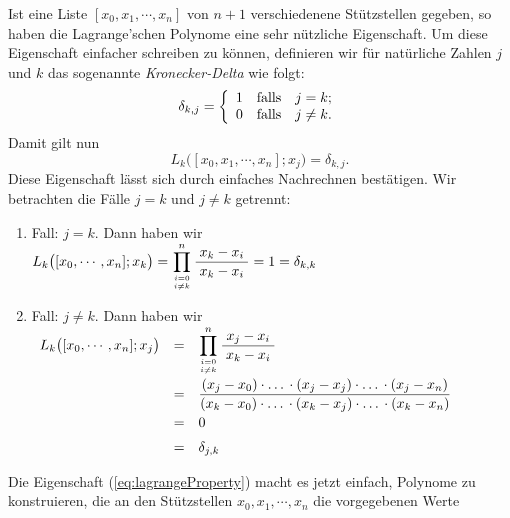 Ist eine Liste $[x_0,x_1,\cdots,x_n]$ von $n+1$ verschiedenene St\"utzstellen gegeben, so
haben die Lagrange'schen Polynome eine sehr n\"utzliche Eigenschaft.  Um diese
Eigenschaft einfacher schreiben zu k\"onnen, definieren wir f\"ur nat\"urliche Zahlen $j$ und
$k$ das sogenannte \emph{Kronecker-Delta} wie folgt:
\begin{equation}
  \label{eq:kroneckerDelta}
  \delta_{k,j} = \left\{ \begin{array}[c]{ll}
                          1 & \mbox{falls} \quad j = k;      \\
                          0 & \mbox{falls} \quad j \not= k.
                         \end{array}
                 \right.  
\end{equation}
Damit gilt nun
\begin{equation}
  \label{eq:lagrangeProperty}
L_k\bigl([x_0,x_1,\cdots,x_n];x_j\bigr) = \delta_{k,j}. 
\end{equation}
Diese Eigenschaft l\"asst sich durch einfaches Nachrechnen best\"atigen.  Wir betrachten die F\"alle
$j=k$ und $j\not=k$ getrennt:
\begin{enumerate}
\item Fall: $j=k$.  Dann haben wir 
      \\[0.2cm]
      \hspace*{0.0cm}
      $\displaystyle L_k\bigl([x_0,\cdots,x_n];x_k\bigr) = \prod\limits_{i=0 \atop i\not=k}^n
      \displaystyle\frac{\;\displaystyle x_k-x_i\;}{\;\displaystyle x_k-x_i\;} = 1 = \delta_{k,k}$
\item Fall: $j\not=k$.  Dann haben wir 
      \\[0.2cm]
      \hspace*{-0.0cm}
      $
      \begin{array}[c]{lcl}
      L_k\bigl([x_0,\cdots,x_n];x_j\bigr) 
      & = & \displaystyle\prod\limits_{i=0 \atop i\not=k}^n \displaystyle\frac{\;\displaystyle x_j-x_i\;}{\;\displaystyle x_k-x_i\;} \\[0.6cm]
      & = & \displaystyle\frac{(x_j - x_0) \cdot \mbox{$\dots$} \cdot  (x_j - x_j) \cdot \mbox{$\dots$} \cdot (x_j - x_n)}{
                     (x_k - x_0) \cdot \mbox{$\dots$} \cdot (x_k - x_j) \cdot \mbox{$\dots$} \cdot (x_k - x_n)} 
            \\[0.3cm]
      & = & 0 \\[0.2cm]
      & = & \delta_{j,k}
      \end{array}
      $
\end{enumerate}
Die Eigenschaft (\ref{eq:lagrangeProperty}) macht es jetzt einfach, Polynome zu
konstruieren, die an den  St\"utzstellen $x_0,x_1,\cdots,x_n$ die vorgegebenen Werte 
